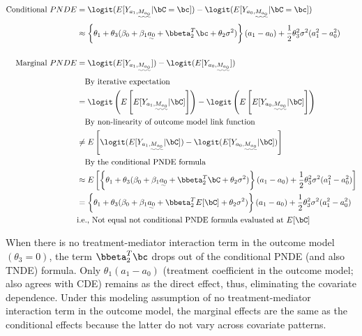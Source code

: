 \documentclass[dvipdfmx,10pt]{article}
\begin{document}
\begin{align*}
  \text{Conditional }PNDE
  &= \logit(E[Y_{a_{1},\uwave{M_{a_{0}}}} | \bC = \bc]) - \logit(E[Y_{a_{0},\uwave{M_{a_{0}}}} | \bC = \bc])\\
  &\approx \left\{ \theta_{1} + \theta_{3}(\beta_{0} + \beta_{1}\uwave{a_{0}} + \bbeta_{2}^{T}\bc + \theta_{2}\sigma^{2}) \right\} (a_{1} - a_{0}) + \frac{1}{2} \theta_{3}^{2}\sigma^{2}(a_{1}^{2} - a_{0}^{2})\\
  \\
  \text{Marginal }PNDE
  &= \logit(E[Y_{a_{1},\uwave{M_{a_{0}}}}]) - \logit(E[Y_{a_{0},\uwave{M_{a_{0}}}}])\\
  &~~~\text{By iterative expectation}\\
  &= \logit\left(E \left[ E[Y_{a_{1},\uwave{M_{a_{0}}}} | \bC] \right]\right) - \logit\left(E \left[ E[Y_{a_{0},\uwave{M_{a_{0}}}} | \bC] \right]\right)\\
  &~~~\text{By non-linearity of outcome model link function}\\
  &\ne E \left[ \logit(E[Y_{a_{1},\uwave{M_{a_{0}}}} | \bC]) - \logit(E[Y_{a_{0},\uwave{M_{a_{0}}}} | \bC]) \right]\\
  &~~~\text{By the conditional PNDE formula}\\
  &\approx E \left[ \left\{ \theta_{1} + \theta_{3}(\beta_{0} + \beta_{1}\uwave{a_{0}} + \bbeta_{2}^{T}\bC + \theta_{2}\sigma^{2}) \right\} (a_{1} - a_{0}) + \frac{1}{2} \theta_{3}^{2}\sigma^{2}(a_{1}^{2} - a_{0}^{2}) \right]\\
  &= \left\{ \theta_{1} + \theta_{3}(\beta_{0} + \beta_{1}\uwave{a_{0}} + \bbeta_{2}^{T}E[\bC] + \theta_{2}\sigma^{2}) \right\} (a_{1} - a_{0}) + \frac{1}{2} \theta_{3}^{2}\sigma^{2}(a_{1}^{2} - a_{0}^{2})\\
  &\text{i.e., Not equal not conditional PNDE formula evaluated at }E[\bC]\\
\end{align*}

When there is no treatment-mediator interaction term in the outcome model \((\theta_{3} = 0)\), the term \(\bbeta_{2}^{T}\bc\) drops out of the conditional PNDE (and also TNDE) formula. Only \(\theta_{1}(a_{1} - a_{0})\) (treatment coefficient in the outcome model; also agrees with CDE) remains as the direct effect, thus, eliminating the covariate dependence. Under this modeling assumption of no treatment-mediator interaction term in the outcome model, the marginal effects are the same as the conditional effects because the latter do not vary across covariate patterns.
\end{document}
